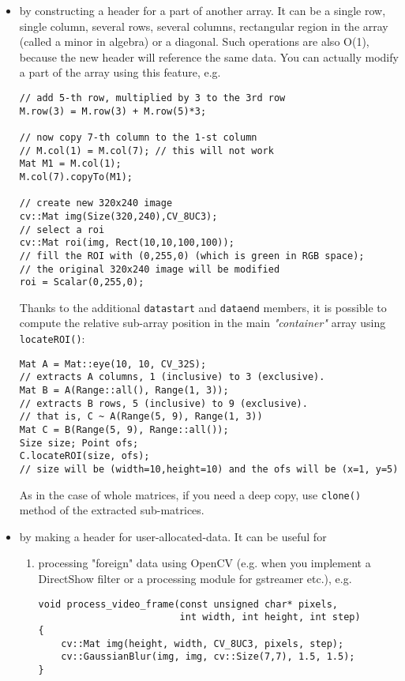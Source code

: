 \begin{itemize}
\item by constructing a header for a part of another array. It can be a single row, single column,
      several rows, several columns, rectangular region in the array (called a minor in algebra) or
      a diagonal. Such operations are also O(1), because the new header will reference the same data.
      You can actually modify a part of the array using this feature, e.g.
          
\begin{lstlisting}
// add 5-th row, multiplied by 3 to the 3rd row
M.row(3) = M.row(3) + M.row(5)*3;

// now copy 7-th column to the 1-st column
// M.col(1) = M.col(7); // this will not work
Mat M1 = M.col(1);
M.col(7).copyTo(M1);

// create new 320x240 image
cv::Mat img(Size(320,240),CV_8UC3);
// select a roi
cv::Mat roi(img, Rect(10,10,100,100));
// fill the ROI with (0,255,0) (which is green in RGB space);
// the original 320x240 image will be modified
roi = Scalar(0,255,0);
\end{lstlisting}

      Thanks to the additional \texttt{datastart} and \texttt{dataend} members, it is possible to
      compute the relative sub-array position in the main \emph{"container"} array using \texttt{locateROI()}:
      
\begin{lstlisting}
Mat A = Mat::eye(10, 10, CV_32S);
// extracts A columns, 1 (inclusive) to 3 (exclusive).
Mat B = A(Range::all(), Range(1, 3));
// extracts B rows, 5 (inclusive) to 9 (exclusive).
// that is, C ~ A(Range(5, 9), Range(1, 3))
Mat C = B(Range(5, 9), Range::all());
Size size; Point ofs;
C.locateROI(size, ofs);
// size will be (width=10,height=10) and the ofs will be (x=1, y=5)
\end{lstlisting}
          
      As in the case of whole matrices, if you need a deep copy, use \texttt{clone()} method
      of the extracted sub-matrices.
          
\item by making a header for user-allocated-data. It can be useful for
    \begin{enumerate}
        \item processing "foreign" data using OpenCV (e.g. when you implement
        a DirectShow filter or a processing module for gstreamer etc.), e.g.
            
\begin{lstlisting}
void process_video_frame(const unsigned char* pixels,
                         int width, int height, int step)
{
    cv::Mat img(height, width, CV_8UC3, pixels, step);
    cv::GaussianBlur(img, img, cv::Size(7,7), 1.5, 1.5);
}
\end{lstlisting}
            

\end{enumerate}
\end{itemize}
